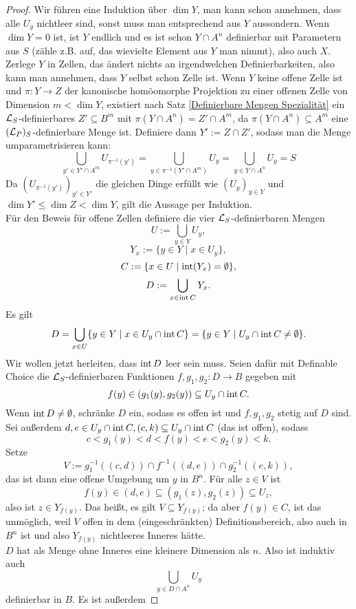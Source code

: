 \begin{proof}
	Wir führen eine Induktion über $\dim Y$, man kann schon annehmen, dass alle $U_y$ nichtleer sind, sonst muss man entsprechend aus $Y$ aussondern. Wenn $\dim Y=0$ ist, ist $Y$ endlich und es ist schon $Y\cap A^n$ definierbar mit Parametern aus $S$ (zähle z.B. auf, das wievielte Element aus $Y$ man nimmt), also auch $X$.\\
	Zerlege $Y$ in Zellen, das ändert nichts an irgendwelchen Definierbarkeiten, also kann man annehmen, dass $Y$ selbst schon Zelle ist. Wenn $Y$ keine offene Zelle ist und $\pi:Y\rightarrow Z$ der kanonische homöomorphe Projektion zu einer offenen Zelle von Dimension $m<\dim Y$, existiert nach Satz \ref{Definierbare Mengen Spezialität} ein $\mathcal{L}_S$-definierbares $Z'\subseteq B^m$ mit $\pi(Y\cap A^n)=Z'\cap A^m$, da $\pi(Y\cap A^n)\subseteq A^m$ eine $(\mathcal{L}_P)_S$-definierbare Menge ist. Definiere dann $Y':=Z\cap Z'$, sodass man die Menge umparametrisieren kann:
	$$\bigcup\limits_{y'\in Y'\cap A^m}U_{\pi^{-1}(y')}=\bigcup\limits_{y\in\pi^{-1}(Y'\cap A^m)}U_y=\bigcup\limits_{y\in Y\cap A^n}U_y=S$$
	Da $(U_{\pi^{-1}(y')})_{y'\in Y'}$ die gleichen Dinge erfüllt wie $(U_y)_{y\in Y}$ und $\dim Y'\leq\dim Z<\dim Y$, gilt die Aussage per Induktion.\\
	Für den Beweis für offene Zellen definiere die vier $\mathcal{L}_S$-definierbaren Mengen $$U:=\bigcup\limits_{y\in Y}U_y,$$ $$Y_x:=\{y\in Y\mid x\in U_y\},$$ $$C:=\{x\in U\mid\operatorname{int}(Y_x)=\emptyset\},$$ $$D:=\bigcup\limits_{x\in\operatorname{int} C}Y_x.$$
	Es gilt $$D=\bigcup\limits_{x\in U}\{y\in Y\mid x\in U_y\cap\operatorname{int} C\}=\{y\in Y\mid U_y\cap\operatorname{int} C\neq\emptyset\}.$$
	Wir wollen jetzt herleiten, dass $\operatorname{int} D$ leer sein muss. Seien dafür mit Definable Choice die $\mathcal{L}_S$-definierbaren Funktionen $f,g_1,g_2:D\rightarrow B$ gegeben mit $$f(y)\in(g_1(y),g_2(y))\subseteq U_y\cap\operatorname{int} C.$$
	Wenn $\operatorname{int} D\neq\emptyset$, schränke $D$ ein, sodass es offen ist und $f,g_1,g_2$ stetig auf $D$ sind. Sei außerdem $d,e\in U_y\cap\operatorname{int} C, (c,k)\subseteq U_y\cap\operatorname{int} C$ (das ist offen), sodass $$c<g_1(y)<d<f(y)<e<g_2(y)<k.$$ Setze $$V:=g_1^{-1}((c,d))\cap f^{-1}((d,e))\cap g_2^{-1}((e,k)),$$ das ist dann eine offene Umgebung um $y$ in $B^n$. Für alle $z\in V$ ist $$f(y)\in(d,e)\subseteq(g_1(z),g_2(z))\subseteq U_z,$$ also ist $z\in Y_{f(y)}$. Das heißt, es gilt $V\subseteq Y_{f(y)}$; da aber $f(y)\in C$, ist das unmöglich, weil $V$ offen in dem (eingeschränkten) Definitionsbereich, also auch in $B^n$ ist und also $Y_{f(y)}$ nichtleeres Inneres hätte.\\
	$D$ hat als Menge ohne Inneres eine kleinere Dimension als $n$. Also ist induktiv auch $$\bigcup\limits_{y\in D\cap A^n}U_y$$ definierbar in $B$. Es ist außerdem

\end{proof}
